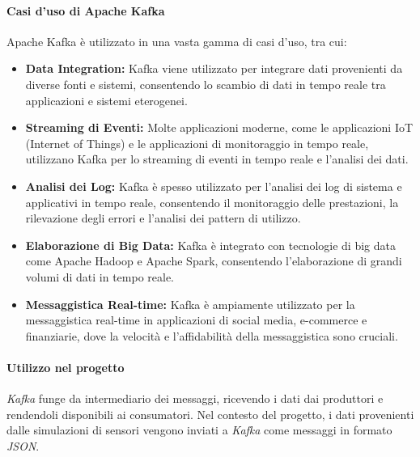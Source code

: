 \paragraph{Casi d'uso di Apache Kafka}

Apache Kafka è utilizzato in una vasta gamma di casi d'uso, tra cui:

\begin{itemize}
  \item \textbf{Data Integration:} Kafka viene utilizzato per integrare dati provenienti da diverse fonti e sistemi, consentendo lo scambio di dati in tempo reale tra applicazioni e sistemi eterogenei.
  
  \item \textbf{Streaming di Eventi:} Molte applicazioni moderne, come le applicazioni IoT (Internet of Things) e le applicazioni di monitoraggio in tempo reale, utilizzano Kafka per lo streaming di eventi in tempo reale e l'analisi dei dati.
  
  \item \textbf{Analisi dei Log:} Kafka è spesso utilizzato per l'analisi dei log di sistema e applicativi in tempo reale, consentendo il monitoraggio delle prestazioni, la rilevazione degli errori e l'analisi dei pattern di utilizzo.
  
  \item \textbf{Elaborazione di Big Data:} Kafka è integrato con tecnologie di big data come Apache Hadoop e Apache Spark, consentendo l'elaborazione di grandi volumi di dati in tempo reale.
  
  \item \textbf{Messaggistica Real-time:} Kafka è ampiamente utilizzato per la messaggistica real-time in applicazioni di social media, e-commerce e finanziarie, dove la velocità e l'affidabilità della messaggistica sono cruciali.
\end{itemize}

\paragraph{Utilizzo nel progetto}
\textit{Kafka} funge da intermediario dei messaggi, ricevendo i dati dai produttori e rendendoli disponibili ai consumatori. Nel contesto del progetto, i dati provenienti dalle simulazioni di sensori vengono inviati a \textit{Kafka} come messaggi in formato \textit{JSON}.

